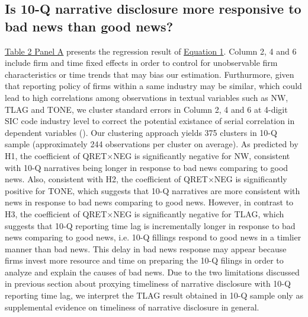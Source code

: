 \documentclass[a4paper]{article}
\begin{document}
\begin{spacing}{2}
\subsection{Is 10-Q narrative disclosure more responsive to bad news than good news?}
\hyperref[T2PA]{Table 2 Panel A} presents the regression result of \hyperref[eq1]{Equation 1}. Column 2, 4 and 6 include firm and time fixed effects in order to control for unobservable firm characteristics or time trends that may bias our estimation. Furthurmore, given that reporting policy of firms within a same industry may be similar, which could lead to high correlations among observations in textual variables such as NW, TLAG and TONE, we cluster standard errors in Column 2, 4 and 6 at 4-digit SIC code industry level to correct the potential existance of serial correlation in dependent variables (\cite{petersenEstimatingStandardErrors2009}). Our clustering approach yields 375 clusters in 10-Q sample (approximately 244 observations per cluster on average). As predicted by H1, the coefficient of QRET$\times$NEG is significantly negative for NW, consistent with 10-Q narratives being longer in response to bad news comparing to good news. Also, consistent with H2, the coefficient of QRET$\times$NEG is significantly positive for TONE, which suggests that 10-Q narratives are more consistent with news in response to bad news comparing to good news. However, in contrast to H3, the coefficient of QRET$\times$NEG is significantly negative for TLAG, which suggests that 10-Q reporting time lag is incrementally longer in response to bad news comparing to good news, i.e. 10-Q fillings respond to good news in a timlier manner than bad news. This delay in bad news response may appear because firms invest more resource and time on preparing the 10-Q filings in order to analyze and explain the causes of bad news. Due to the two limitations discussed in previous section about proxying timeliness of narrative disclosure with 10-Q reporting time lag, we interpret the TLAG result obtained in 10-Q sample only as supplemental evidence on timeliness of narrative disclosure in general.


\end{spacing}
\end{document}
